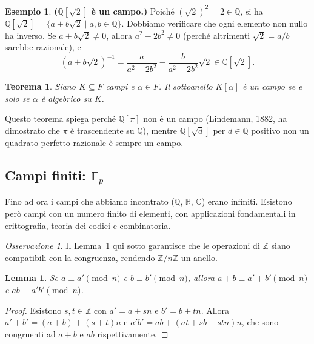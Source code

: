 \documentclass[11pt, a4paper]{book}
\theoremstyle{definition}
\newtheorem{esempio}[definizione]{Esempio}
\theoremstyle{plain}
\newtheorem{teorema}[definizione]{Teorema}
\newtheorem{lemma}[definizione]{Lemma}
\theoremstyle{remark}
\newtheorem{osservazione}[definizione]{Osservazione}
\newcommand{\Z}{\mathbb{Z}}
\newcommand{\Q}{\mathbb{Q}}
\newcommand{\R}{\mathbb{R}}
\newcommand{\C}{\mathbb{C}}
\begin{document}
\begin{exbox}
\begin{esempio}
\textbf{($\Q[\sqrt{2}]$ è un campo.)}
Poiché $(\sqrt{2})^2 = 2 \in \Q$, si ha $\Q[\sqrt{2}] = \{a + b\sqrt{2} \mid a, b \in \Q\}$. Dobbiamo verificare che ogni elemento non nullo ha inverso. Se $a + b\sqrt{2} \neq 0$, allora $a^2 - 2b^2 \neq 0$ (perché altrimenti $\sqrt{2} = a/b$ sarebbe razionale), e
\[
  (a + b\sqrt{2})^{-1} = \frac{a}{a^2 - 2b^2} - \frac{b}{a^2 - 2b^2}\sqrt{2} \in \Q[\sqrt{2}].
\]
\end{esempio}
\end{exbox}

\begin{teorema}
Siano $K \subseteq F$ campi e $\alpha \in F$. Il sottoanello $K[\alpha]$ è un campo se e solo se $\alpha$ è algebrico su $K$.
\end{teorema}

Questo teorema spiega perché $\Q[\pi]$ non è un campo (Lindemann, 1882, ha dimostrato che $\pi$ è trascendente su $\Q$), mentre $\Q[\sqrt{d}]$ per $d \in \Q$ positivo non un quadrato perfetto razionale è sempre un campo.

\subsection{Campi finiti: $\mathbb{F}_p$}
\label{sec:Zmodulo}

Fino ad ora i campi che abbiamo incontrato ($\Q$, $\R$, $\C$) erano infiniti. Esistono però campi con un numero finito di elementi, con applicazioni fondamentali in crittografia, teoria dei codici e combinatoria.

\begin{osservazione}
Il Lemma~\ref{lem:congruenza} qui sotto garantisce che le operazioni di $\Z$ siano compatibili con la congruenza, rendendo $\Z/n\Z$ un anello.
\end{osservazione}

\begin{lemma}
\label{lem:congruenza}
Se $a \equiv a' \pmod{n}$ e $b \equiv b' \pmod{n}$, allora $a + b \equiv a' + b' \pmod{n}$ e $ab \equiv a'b' \pmod{n}$.
\end{lemma}

\begin{proof}
Esistono $s, t \in \Z$ con $a' = a + sn$ e $b' = b + tn$. Allora $a' + b' = (a+b) + (s+t)n$ e $a'b' = ab + (at + sb + stn)n$, che sono congruenti ad $a+b$ e $ab$ rispettivamente.
\end{proof}
\end{document}
